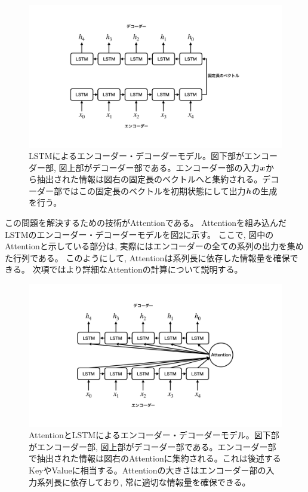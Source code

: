 \begin{figure}[htbp]
 \centering
 \includegraphics[trim = 100 100 100 200, width=1.0\textwidth, clip]{Figure/2DeepLearning/18EncoderDecoderLSTM.png}
 \caption[LSTMによるエンコーダー・デコーダーモデル]{LSTMによるエンコーダー・デコーダーモデル。図下部がエンコーダー部, 図上部がデコーダー部である。エンコーダー部の入力${\mbox{\boldmath{$x$}}}$から抽出された情報は図右の固定長のベクトルへと集約される。デコーダー部ではこの固定長のベクトルを初期状態にして出力${\mbox{\boldmath{$h$}}}$の生成を行う。}
 \label{18EncoderDecoderLSTM}
\end{figure}

この問題を解決するための技術がAttentionである。
Attentionを組み込んだLSTMのエンコーダー・デコーダーモデルを図\ref{19EncoderDecoderAttention}に示す。
ここで, 図中のAttentionと示している部分は, 実際にはエンコーダーの全ての系列の出力を集めた行列である。
このようにして, Attentionは系列長に依存した情報量を確保できる。
次項ではより詳細なAttentionの計算について説明する。

\begin{figure}[htbp]
 \centering
 \includegraphics[trim = 100 100 100 200, width=1.0\textwidth, clip]{Figure/2DeepLearning/19EncoderDecoderAttention.png}
 \caption[AttentionとLSTMによるエンコーダー・デコーダーモデル]{AttentionとLSTMによるエンコーダー・デコーダーモデル。図下部がエンコーダー部, 図上部がデコーダー部である。エンコーダー部で抽出された情報は図右のAttentionに集約される。これは後述するKeyやValueに相当する。Attentionの大きさはエンコーダー部の入力系列長に依存しており, 常に適切な情報量を確保できる。}
 \label{19EncoderDecoderAttention}
\end{figure}



